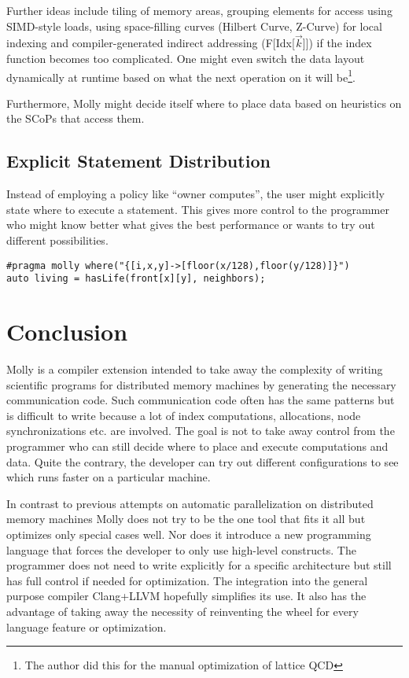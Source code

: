 \documentclass{sigplanconf}
\newcommand{\dquote}[1]{``#1''}
\begin{document}
Further ideas include tiling of memory areas, grouping elements for access using SIMD-style loads, using space-filling curves (Hilbert Curve, Z-Curve) for local indexing and compiler-generated indirect addressing (F[Idx[$\vec k$]]) if the index function becomes too complicated. One might even switch the data layout dynamically at runtime based on what the next operation on it will be\footnote{The author did this for the manual optimization of lattice QCD}.

Furthermore, Molly might decide itself where to place data based on heuristics on the SCoPs that access them.



\subsection{Explicit Statement Distribution}

Instead of employing a policy like \dquote{owner computes}, the user might explicitly state where to execute a statement. This gives more control to the programmer who might know better what gives the best performance or wants to try out different possibilities.

{\small
\begin{verbatim}
#pragma molly where("{[i,x,y]->[floor(x/128),floor(y/128)]}")
auto living = hasLife(front[x][y], neighbors);
\end{verbatim}
}





\section{Conclusion}\label{sct:conclusion}

Molly is a compiler extension intended to take away the complexity of writing scientific programs for distributed memory machines by generating the necessary communication code. Such communication code often has the same patterns but is difficult to write because a lot of index computations, allocations, node synchronizations etc. are involved. The goal is not to take away control from the programmer who can still decide where to place and execute computations and data. Quite the contrary, the developer can try out different configurations to see which runs faster on a particular machine.

In contrast to previous attempts on automatic parallelization on distributed memory machines Molly does not try to be the one tool that fits it all but optimizes only special cases well. Nor does it introduce a new programming language that forces the developer to only use high-level constructs. The programmer does not need to write explicitly for a specific architecture but still has full control if needed for optimization. The integration into the general purpose compiler Clang+LLVM hopefully simplifies its use. It also has the advantage of taking away the necessity of reinventing the wheel for every language feature or optimization.
\end{document}
